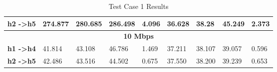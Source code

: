 \begin{table}[h!]
\begin{tabular}{l|l|l|l|l|l|l|l|l|}
\multicolumn{1}{|l|}{\textbf{h2 -\textgreater h5}} & 274.877                           & 280.685                           & 286.498                           & 4.096                              & 36.628                            & 38.28                             & 45.249                            & 2.373                              \\ \hline
\multicolumn{9}{|c|}{\textbf{10 Mbps}}                                                                                                                                                                                                                                                                                                               \\ \hline
\multicolumn{1}{|l|}{\textbf{h1 -\textgreater h4}} & 41.814                            & 43.108                            & 46.786                            & 1.469                              & 37.211                            & 38.107                            & 39.057                            & 0.596                              \\ \hline
\multicolumn{1}{|l|}{\textbf{h2 -\textgreater h5}} & 42.486                            & 43.516                            & 44.502                            & 0.675                              & 37.550                            & 38.200                            & 39.239                            & 0.653                              \\ \hline
\end{tabular}
\caption{Test Case 1 Results}
\label{table:test1}
\end{table}

